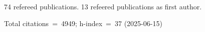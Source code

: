 74 refereed publications. 13 refeered publications as first author.

Total citations~=~4949; h-index~=~37 (2025-06-15)